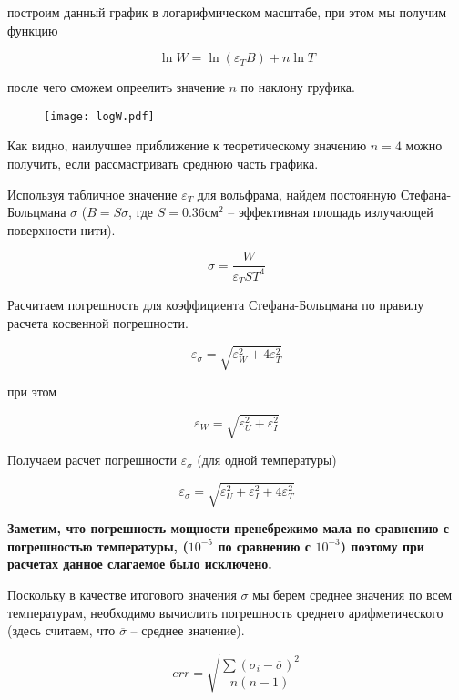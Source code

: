 	построим данный график в логарифмическом масштабе, при этом мы получим функцию

	\begin{equation*}
		\ln W = \ln (\varepsilon_T B) + n \ln T
	\end{equation*}

	после чего сможем опреелить значение $n$ по наклону груфика.

	\begin{figure}[h]
		\centering
		\texttt{[image: logW.pdf]}
		\label{fig:logW}
	\end{figure}

	Как видно, наилучшее приближение к теоретическому значению $n = 4$ можно получить, если рассмастривать среднюю часть графика.

	Используя табличное значение $\varepsilon_T$ для вольфрама, найдем постоянную Стефана-Больцмана $\sigma$ 
	($B = S \sigma$, где $S = 0.36 \text{см}^2$ -- эффективная площадь излучающей поверхности нити). 

	\[\sigma = \frac{W}{\varepsilon_T S T^4} \]

	Расчитаем погрешность для коэффициента Стефана-Больцмана по правилу расчета косвенной погрешности.

	\[ \varepsilon_{\sigma} = \sqrt{\varepsilon_W^2 + 4 \varepsilon_T^2} \]

	при этом

	\[ \varepsilon_W = \sqrt{\varepsilon_U^2 + \varepsilon_I^2} \]

	Получаем расчет погрешности $\varepsilon_{\sigma}$ (для одной температуры)

	\[ \varepsilon_{\sigma} = \sqrt{\varepsilon_U^2 + \varepsilon_I^2 + 4 \varepsilon_T^2} \]

	\textbf{Заметим, что погрешность мощности пренебрежимо мала по сравнению с погрешностью температуры,
	($10^{-5}$ по сравнению с $10^{-3}$) поэтому при расчетах данное слагаемое было исключено.}

	Поскольку в качестве итогового значения $\sigma$ мы берем среднее значения по всем температурам,
	необходимо вычислить погрешность среднего арифметического (здесь считаем, что 
	$\overline{\sigma}$ -- среднее значение).

	\[ err = \sqrt{\frac{\sum (\sigma_i - \overline{\sigma})^2}{n(n - 1)}} \]

	

	\begin{center}
	\end{center}

